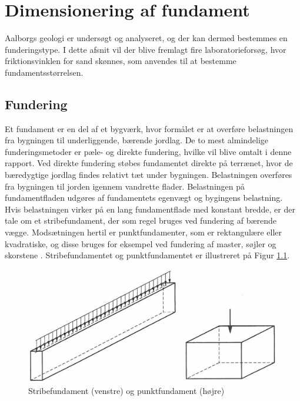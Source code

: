 \chapter{Dimensionering af fundament}
Aalborgs geologi er undersøgt og analyseret, og der kan dermed bestemmes en funderingstype. I dette afsnit vil der blive fremlagt fire laboratorieforsøg, hvor friktionsvinklen for sand skønnes, som anvendes til at bestemme fundamentsstørrelsen.  

\section{Fundering}
Et fundament er en del af et bygværk, hvor formålet er at overføre belastningen fra bygningen til underliggende, bærende jordlag. De to mest almindelige funderingsmetoder er pæle- og direkte fundering, hvilke vil blive omtalt i denne rapport.
\newline \indent{     }  Ved direkte fundering støbes fundamentet direkte på terrænet, hvor de bæredygtige jordlag findes relativt tæt under bygningen. Belastningen overføres fra bygningen til jorden igennem vandrette flader. Belastningen på fundamentfladen udgøres af fundamentets egenvægt og bygingens belastning. Hvis belastningen virker på en lang fundamentflade med konstant bredde, er der tale om et stribefundament, der som regel bruges ved fundering af bærende vægge. Modsætningen hertil er punktfundamenter, som er rektangulære eller kvadratiske, og disse bruges for eksempel ved fundering af master, søjler og skorstene \citep[ s. 221]{geoteknik}. Stribefundamentet og punktfundamentet er illustreret på Figur \ref{fig:fundament}. 

\begin{figure}[htbp] \centering
	\begin{minipage}[b]{0.48\textwidth}\centering
		\includegraphics[width=1.0\textwidth]{billeder/fundament.png}
		\caption{Stribefundament (venstre) og punktfundament (højre) \citep[ s. 221]{geoteknik}}
		\label{fig:fundament}
	\end{minipage}\hfill
\end{figure}

